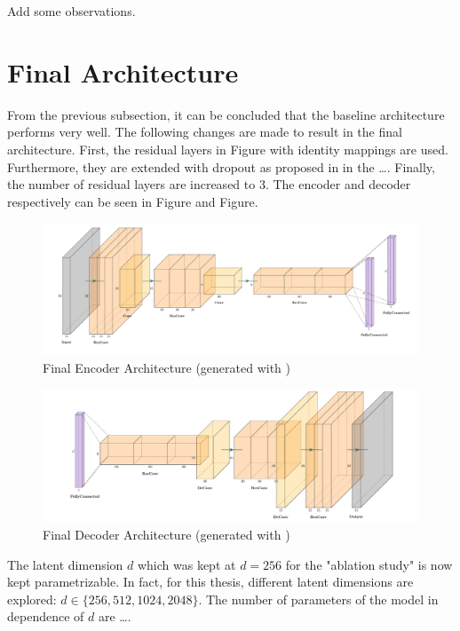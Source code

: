 Add some observations.

\section{Final Architecture}
From the previous subsection, it can be concluded that the baseline architecture performs very well.
The following changes are made to result in the final architecture.
First, the residual layers in Figure  with identity mappings are used.
Furthermore, they are extended with dropout as proposed in \parencite{WideResNet} in the \dots.
Finally, the number of residual layers are increased to $3$.
The encoder and decoder respectively can be seen in Figure and Figure.
\begin{figure}[h!]
    \centering
    \includegraphics[width=\textwidth]{figures/model_architecture/build/final_vae_encoder.pdf}
    \caption{Final Encoder Architecture (generated with \parencite{NNVisualization})}
\end{figure}
\begin{figure}[h!]
    \centering
    \includegraphics[width=\textwidth]{figures/model_architecture/build/final_vae_decoder.pdf}
    \caption{Final Decoder Architecture (generated with \parencite{NNVisualization})}
\end{figure}
The latent dimension $d$ which was kept at $d = 256$ for the "ablation study" is now kept parametrizable.
In fact, for this thesis, different latent dimensions are explored: $d \in \{ 256, 512, 1024, 2048 \}$.
The number of parameters of the model in dependence of $d$ are \dots.

